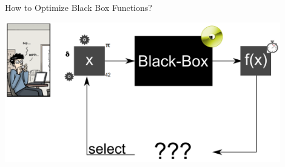 \begin{frame}[c]{How to Optimize Black Box Functions?}

\centering
\includegraphics[width=0.9\textwidth]{images/black_box_aut_opt.png}

\end{frame}
